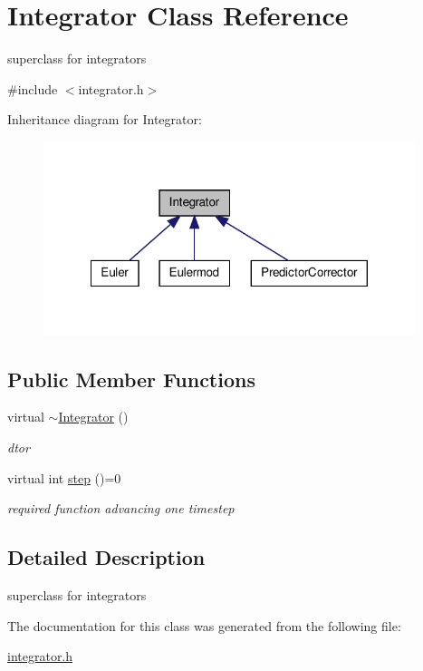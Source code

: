 \hypertarget{classIntegrator}{\section{\-Integrator \-Class \-Reference}
\label{classIntegrator}
}


superclass for integrators  




{\ttfamily \#include $<$integrator.\-h$>$}



\-Inheritance diagram for \-Integrator\-:\nopagebreak
\begin{figure}[H]
\begin{center}
\leavevmode
\includegraphics[width=308pt]{classIntegrator__inherit__graph}
\end{center}
\end{figure}
\subsection*{\-Public \-Member \-Functions}
\begin{DoxyCompactItemize}
\item 
\hypertarget{classIntegrator_ada0ac381fb6d891c8074fd1ed2102229}{virtual \hyperlink{classIntegrator_ada0ac381fb6d891c8074fd1ed2102229}{$\sim$\-Integrator} ()}\label{classIntegrator_ada0ac381fb6d891c8074fd1ed2102229}

\begin{DoxyCompactList}\small\item\em dtor \end{DoxyCompactList}\item 
\hypertarget{classIntegrator_a453bb8d88d3e35e6212bb43d61ef7253}{virtual int \hyperlink{classIntegrator_a453bb8d88d3e35e6212bb43d61ef7253}{step} ()=0}\label{classIntegrator_a453bb8d88d3e35e6212bb43d61ef7253}

\begin{DoxyCompactList}\small\item\em required function advancing one timestep \end{DoxyCompactList}\end{DoxyCompactItemize}


\subsection{\-Detailed \-Description}
superclass for integrators 

\-The documentation for this class was generated from the following file\-:\begin{DoxyCompactItemize}
\item 
\hyperlink{integrator_8h}{integrator.\-h}\end{DoxyCompactItemize}
